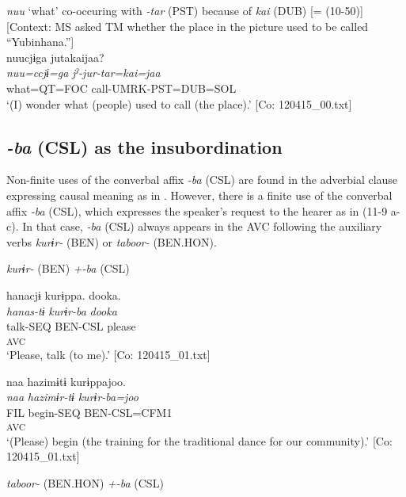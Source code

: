 \ea\label{ex:11-8}  \textit{nuu} ‘what’ co-occuring with \textit{{}-tar} (PST) because of \textit{kai} (DUB) [= (10-50)]   [Context: MS asked TM whether the place in the picture used to be called “Yubinhana.”]\\
  
      \glll    nuucjɨga  jutakaijaa?\\
    \textit{nuu=ccjɨ=ga}  \textit{jˀ-jur-tar=kai=jaa}\\
    what=QT=FOC  call-UMRK-PST=DUB=SOL\\
    \glt     ‘(I) wonder what (people) used to call (the place).’ [Co: 120415\_00.txt]
\z

\subsection{\textit{{}-ba} (CSL) as the insubordination}\label{sec:11.2.2}

Non-finite uses of the converbal affix \textit{-ba} (CSL) are found in the adverbial clause expressing causal meaning as in . However, there is a finite use of the converbal affix \textit{-ba} (CSL), which expresses the speaker’s request to the hearer as in (11-9 a-c). In that case, \textit{{}-ba} (CSL) always appears in the AVC following the auxiliary verbs \textit{kurɨr-} (BEN) or \textit{taboor-} (BEN.HON).

\ea\label{ex:11-9}  \textit{kurɨr-} (BEN) \textit{+-ba} (CSL)

  \ea  
      \gllll    hanacjɨ  kurɨppa.  dooka.\\
      \textit{hanas-tɨ}  \textit{kurɨr-ba}  \textit{dooka}\\
      talk-SEQ  BEN-CSL  please\\
      [Lex. verb  Aux. verb]\textsubscript{AVC}  \\
      ‘Please, talk (to me).’      [Co: 120415\_01.txt]

  \ex  
      \gllll    naa  hazimɨtɨ  kurɨppajoo.\\
      \textit{naa}  \textit{hazimɨr-tɨ}  \textit{kurɨr-ba=joo}\\
      FIL  begin-SEQ  BEN-CSL=CFM1\\
        [Lex. verb  Aux. verb]\textsubscript{AVC}\\
      ‘(Please) begin (the training for the traditional dance for our community).’      [Co: 120415\_01.txt]

  \textit{taboor-} (BEN.HON) \textit{+-ba} (CSL)

